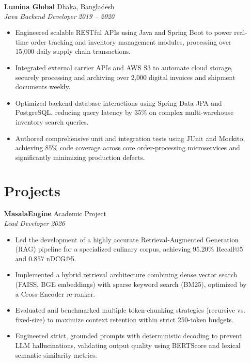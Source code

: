 \documentclass[a4paper,10pt]{article}
\newcommand{\entry}[4]{%
  \noindent\textbf{#1} \hfill #2\\
  \textit{#3} \hfill \textit{#4}\par\vspace{2pt}
}
\begin{document}
\entry{Lumina Global}{Dhaka, Bangladesh}{Java Backend Developer}{2019 -- 2020}
\begin{itemize}
  \item Engineered scalable RESTful APIs using Java and Spring Boot to power real-time order tracking and inventory management modules, processing over 15,000 daily supply chain transactions.
  \item Integrated external carrier APIs and AWS S3 to automate cloud storage, securely processing and archiving over 2,000 digital invoices and shipment documents weekly.
  \item Optimized backend database interactions using Spring Data JPA and PostgreSQL, reducing query latency by 35\% on complex multi-warehouse inventory search queries.
  \item Authored comprehensive unit and integration tests using JUnit and Mockito, achieving 85\% code coverage across core order-processing microservices and significantly minimizing production defects.
\end{itemize}

\section{Projects}
\entry{MasalaEngine}{Academic Project}{Lead Developer}{2026}
\begin{itemize}
  \item Led the development of a highly accurate Retrieval-Augmented Generation (RAG) pipeline for a specialized culinary corpus, achieving 95.20\% Recall@5 and 0.857 nDCG@5.
  \item Implemented a hybrid retrieval architecture combining dense vector search (FAISS, BGE embeddings) with sparse keyword search (BM25), optimized by a Cross-Encoder re-ranker.
  \item Evaluated and benchmarked multiple token-chunking strategies (recursive vs. fixed-size) to maximize context retention within strict 250-token budgets.
  \item Engineered strict, grounded prompts with deterministic decoding to prevent LLM hallucinations, validating output quality using BERTScore and lexical semantic similarity metrics.
\end{itemize}
\end{document}

